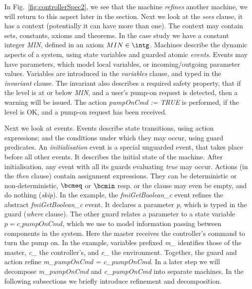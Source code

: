 \documentclass{llncs}%
\begin{document}
 In Fig.~\ref{fig:controllerSpec2}, we see that the machine \emph{refines} another machine, we will return to this aspect later in the section. Next we look at the \emph{sees} clause, it has a context (potentially it can have more than one). The context may contain sets, constants, axioms and theorems. In the case study we have a constant integer \emph{MIN}, defined in an axiom $MIN \in \intg$. Machines describe the dynamic aspects of a system, using state variables and guarded atomic \emph{events}. Events may have parameters, which model local variables, or incoming/outgoing parameter values. Variables are introduced in the \emph{variables} clause, and typed in the \emph{invariant} clause. The invariant also describes a required safety property, that if the level is at or below \emph{MIN}, and a user's pump-on request is detected, then a warning will be issued. The action \emph{pumpOnCmd := TRUE} is performed, if the level is OK, and a pump-on request has been received.

Next we look at events. Events describe state transitions, using action expressions; and the conditions under which they may occur, using guard predicates. An \emph{initialisation} event is a special unguarded event, that takes place before all other events. It describes the initial state of the machine. After initialisation, any event with all its guards evaluating \emph{true} may occur. Actions (in the \emph{then} clause) contain assignment expressions. They can be deterministic or non-deterministic, $\bcmeq$ or $\bcmin$ resp. or the clause may even be empty, and do nothing (\emph{skip}). In the example, the \emph{fmiGetBoolean\_c} event refines the abstract \emph{fmiGetBoolean\_c} event. It declares a parameter \emph{p}, which is typed in the guard (\emph{where} clause). The other guard relates a parameter to a state variable $p = c\_pumpOnCmd$, which we use to model information passing between components in the system. Here the master receives the controller’s command to turn the pump on. In the example, variables prefixed \emph{m\_} identifies those of the master, \emph{c\_} the controller's, and \emph{e\_} the environment. Together, the guard and action refine \emph{m\_pumpOnCmd = c\_pumpOnCmd}. In a later step we will decompose \emph{m\_pumpOnCmd} and \emph{c\_pumpOnCmd} into separate machines. In the following subsections we briefly introduce refinement and decomposition.
\end{document}
